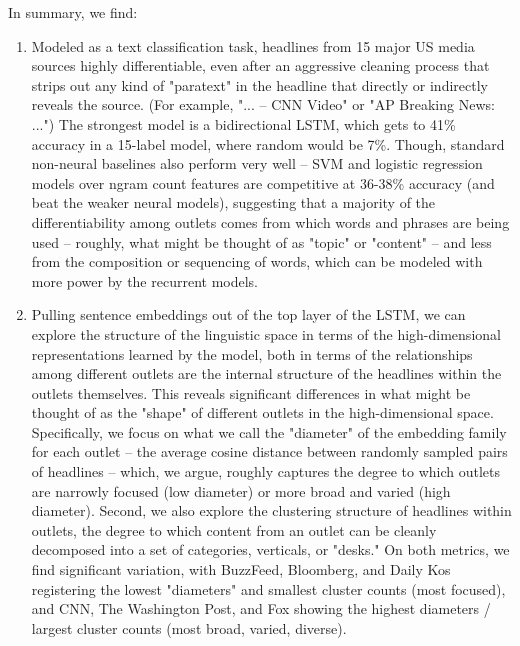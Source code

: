 \documentclass{scrartcl}
\begin{document}
In summary, we find:

\begin{enumerate}

\item Modeled as a text classification task, headlines from 15 major US media sources highly differentiable, even after an aggressive cleaning process that strips out any kind of "paratext" in the headline that directly or indirectly reveals the source. (For example, "... -- CNN Video" or "AP Breaking News: ...") The strongest model is a bidirectional LSTM, which gets to 41\% accuracy in a 15-label model, where random would be 7\%. Though, standard non-neural baselines also perform very well -- SVM and logistic regression models over ngram count features are competitive at 36-38\% accuracy (and beat the weaker neural models), suggesting that a majority of the differentiability among outlets comes from which words and phrases are being used -- roughly, what might be thought of as "topic" or "content" -- and less from the composition or sequencing of words, which can be modeled with more power by the recurrent models.

\item Pulling sentence embeddings out of the top layer of the LSTM, we can explore the structure of the linguistic space in terms of the high-dimensional representations learned by the model, both in terms of the relationships among different outlets are the internal structure of the headlines within the outlets themselves. This reveals significant differences in what might be thought of as the "shape" of different outlets in the high-dimensional space. Specifically, we focus on what we call the "diameter" of the embedding family for each outlet -- the average cosine distance between randomly sampled pairs of headlines -- which, we argue, roughly captures the degree to which outlets are narrowly focused (low diameter) or more broad and varied (high diameter). Second, we also explore the clustering structure of headlines within outlets, the degree to which content from an outlet can be cleanly decomposed into a set of categories, verticals, or "desks." On both metrics, we find significant variation, with BuzzFeed, Bloomberg, and Daily Kos registering the lowest "diameters" and smallest cluster counts (most focused), and CNN, The Washington Post, and Fox showing the highest diameters / largest cluster counts (most broad, varied, diverse).


\end{enumerate}
\end{document}

